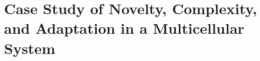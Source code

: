 \chapter{Case Study of Novelty, Complexity, and Adaptation in a Multicellular System}
\label{ch:measuring-cna}

